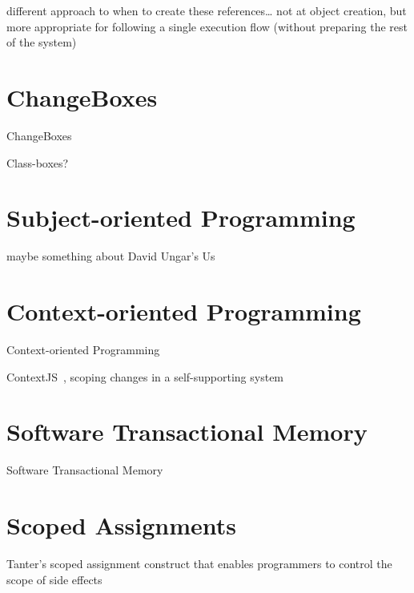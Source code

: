 different approach to when to create these references… not at object creation, but more appropriate for following a single execution flow (without preparing the rest of the system)



\section{ChangeBoxes}
ChangeBoxes~\cite{Denker2007EEC}

Class-boxes? 



\section{Subject-oriented Programming}
maybe something about David Ungar's Us~\cite{}



\section{Context-oriented Programming}
Context-oriented Programming~\cite{Hirschfeld2008COP}

ContextJS~\cite{Lincke2011OIC}, scoping changes in a self-supporting system~\cite{Lincke2012SCS}


\section{Software Transactional Memory}
Software Transactional Memory~\cite{Shavit1995STM}



\section{Scoped Assignments}
Tanter's scoped assignment construct  that enables programmers to control the scope of side effects 



